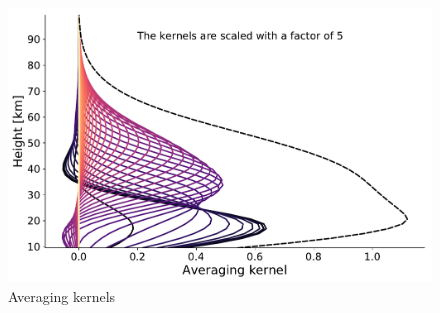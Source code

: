 \documentclass[paper=a4, fontsize=11pt]{scrartcl}
\begin{document}
\begin{figure}[ht]
  \centering
  \includegraphics[width=\textwidth]{plots/averaging_kernels.pdf}
  \caption{Averaging kernels \label{fig:averaging_kernels}}
\end{figure}
\end{document}
